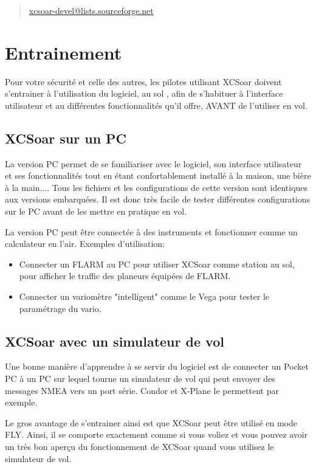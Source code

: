 \begin{quote}
\href{mailto:xcsoar-devel@lists.sourceforge.net}{xcsoar-devel@lists.sourceforge.net}
\end{quote}

\section{Entrainement}
Pour votre sécurité et celle des autres, les pilotes utilisant XCSoar doivent s'entrainer à l'utilisation du logiciel, au sol , afin de s'habituer à l'interface utilisateur et au différentes fonctionnalités qu'il offre, AVANT de l'utiliser en vol.

\subsection*{XCSoar sur un PC}
La version PC permet de se familiariser avec le logiciel, son interface utilisateur et ses fonctionnalités tout en étant confortablement installé à la maison, une bière à la main.... Tous les fichiers et les configurations de cette version sont identiques aux versions embarquées. Il est donc très facile de tester différentes configurations sur le PC avant de les mettre en pratique en vol.

La version PC peut être connectée à des instruments et fonctionner comme un calculateur en l'air. Exemples d'utilisation:

\begin{itemize}
\item Connecter un FLARM au PC pour utiliser XCSoar comme station au sol, pour afficher le traffic des planeurs équipées de FLARM.
\item Connecter un variomètre "intelligent"  comme le Vega pour tester le paramétrage du vario.
\end{itemize}

\subsection*{XCSoar avec un simulateur de vol}
Une bonne manière d'apprendre à se servir du logiciel est de connecter un Pocket PC à un PC sur lequel tourne un simulateur de vol qui peut envoyer des messages NMEA vers un port série. Condor et X-Plane le permettent par exemple.

Le gros avantage de s'entrainer ainsi est que XCSoar peut être utilisé en mode FLY. Ainsi, il se comporte exactement comme si vous voliez et vous pouvez avoir un très bon aperçu du fonctionnement de XCSoar quand vous utilisez le simulateur de vol. 

